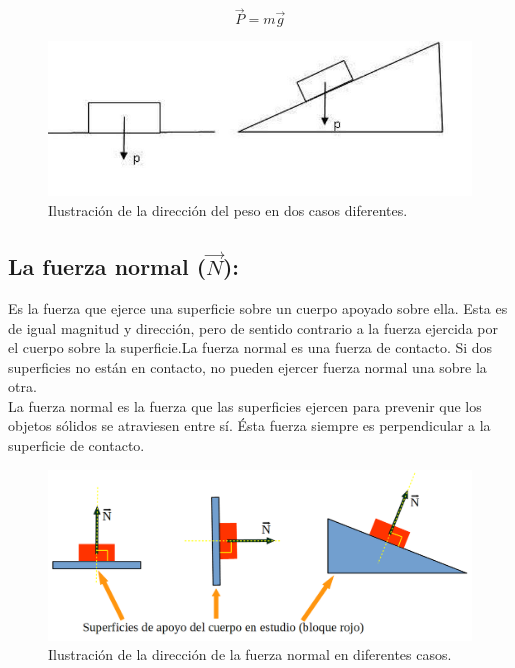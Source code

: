 \documentclass[a5paper,pagesize,10pt,bibtotoc,pointlessnumbers,
normalheadings,DIV=9,fleqn,x11names,table,twoside=false]{scrbook}
\begin{document}
\begin{equation}
\vec{P} = m\vec{g}
\end{equation}

\begin{figure}[ht]
 \centering
 \includegraphics[scale=0.4]{images/peso.jpg}
 \caption{Ilustración de la dirección del peso en dos casos diferentes.}\label{ac}
\end{figure}

\subsection{La fuerza normal ($\vec{N}$):}

Es la fuerza que ejerce una superficie sobre un cuerpo apoyado sobre ella. Esta es de igual magnitud y dirección, pero de sentido 
contrario a la fuerza ejercida por el cuerpo sobre la superficie.La fuerza normal es una fuerza de contacto. Si dos superficies 
no están en contacto, no pueden ejercer fuerza normal una sobre la otra.\\

La fuerza normal es la fuerza que las superficies ejercen para prevenir que los objetos sólidos se atraviesen entre sí. Ésta 
fuerza siempre es perpendicular a la superficie de contacto.

\begin{figure}[ht]
 \centering
 \includegraphics[scale=0.2]{images/fuerzanormal.png}
 \caption{Ilustración de la dirección de la fuerza normal en diferentes casos.}\label{ac}
\end{figure}
\end{document}
